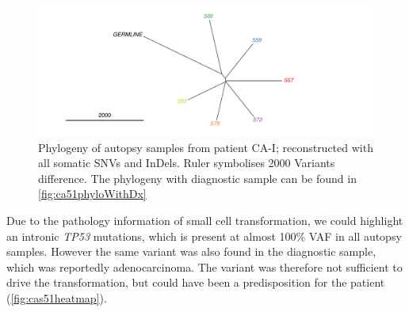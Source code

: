 \begin{figure}[ht]
	\centering
	\includegraphics[width=.99\linewidth]{Figures/CASCADE/CA51/CA51phyloAutopsy.pdf}
	\caption[Phylogeny of autopsy samples from patient CA-I]{Phylogeny of autopsy samples from patient CA-I; reconstructed with all somatic SNVs and InDels. Ruler symbolises 2000 Variants difference. The phylogeny with diagnostic sample can be found in \protect\autoref{fig:ca51phyloWithDx}} \label{fig:ca51phylo}
\end{figure}

Due to the pathology information of small cell transformation, we could highlight an intronic \textit{TP53} mutations, which is present at almost 100\% VAF in all autopsy samples. However the same variant was also found in the diagnostic sample, which was reportedly adenocarcinoma. The variant was therefore not sufficient to drive the transformation, but could have been a predisposition for the patient (\autoref{fig:cas51heatmap}).



